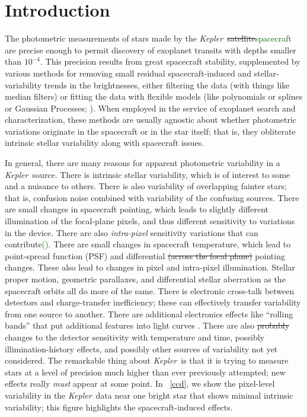 \documentclass[12pt, preprint]{aastex}
\newcommand{\project}[1]{\textsl{#1}}
\newcommand{\Kepler}{\project{Kepler}}
\newcommand{\revise}[1]{\textcolor{darkgreen}{#1}}
\newcommand{\remove}[1]{\sout{#1}}
\begin{document}
\section{Introduction}

The photometric measurements of stars made by the \Kepler\ \remove{satellite}\revise{spacecraft} are precise enough
  to permit discovery of exoplanet transits with depths smaller than $10^{-4}$.
This precision results from great spacecraft stability,
  supplemented by various methods for removing small residual spacecraft-induced and stellar-variability trends in the brightnesses,
  either filtering the data (with things like median filters)
  or fitting the data with flexible models (like polynomials or splines or Gaussian Processes; 
  \citealt{gaussian}).
When employed in the service of exoplanet search and characterization,
  these methods are usually agnostic about whether photometric variations originate in the spacecraft or in the star itself;
  that is, they obliterate intrinsic stellar variability along with spacecraft issues.

In general, there are many reasons for apparent photometric variability in a \Kepler\ source.
There is intrinsic stellar variability,
  which is of interest to some and a nuisance to others.
There is also variability of overlapping fainter stars;
  that is, confusion noise combined with variability of the confusing sources.
There are small changes in spacecraft pointing,
  which leads to slightly different illumination of the focal-plane pixels,
  and thus different sensitivity to variations in the device.
There are also \emph{intra-pixel} sensitivity variations that can contribute\revise{(\citealt{subpixel})}.
There are small changes in spacecraft temperature,
  which lead to point-spread function (PSF) and differential \remove{(across the focal plane)} pointing changes.
These also lead to changes in pixel and intra-pixel illumination.
Stellar proper motion, geometric parallaxes, and differential stellar aberration as the spacecraft orbits all do more of the same.
There is electronic cross-talk between detectors and charge-transfer inefficiency;
  these can effectively transfer variability from one source to another.
There are additional electronics effects like ``rolling bands'' that put additional features into light curves \revise{\citep{handbook}}.
There are also \remove{probably} changes to the detector sensitivity with temperature and time,
  possibly illimination-history effects,
  and possibly other sources of variability not yet considered.
The remarkable thing about \Kepler\ is that it is trying to measure stars at a level of precision
  much higher than ever previously attempted;
  new effects really \emph{must} appear at some point.
In \figurename~\ref{ccd}, we show the pixel-level variability in the \Kepler\ data
  near one bright star that shows minimal intrinsic variability;
  this figure highlights the spacecraft-induced effects.
\end{document}
